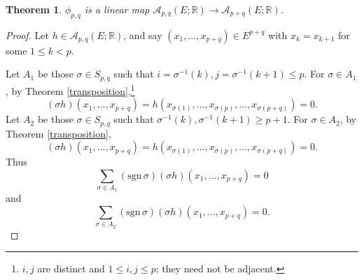 \documentclass{article}
\newcommand{\sgn}{\mathrm{sgn}\,}
\newtheorem{theorem}{Theorem}
\theoremstyle{definition}
\begin{document}
\begin{theorem}
$\phi_{p,q}$ is a linear map $\mathscr{A}_{p,q}(E;\mathbb{R}) \to \mathscr{A}_{p+q}(E;\mathbb{R})$.
\end{theorem}
\begin{proof}
Let $h \in \mathscr{A}_{p,q}(E;\mathbb{R})$,
and say $(x_1,\ldots,x_{p+q}) \in E^{p+q}$ with $x_k=x_{k+1}$ for some $1 \leq k < p$.

Let $A_1$ be those $\sigma \in S_{p,q}$ such that  $i=\sigma^{-1}(k), j=\sigma^{-1}(k+1) \leq p$. For $\sigma \in A_1$,
by Theorem \ref{transposition},\footnote{$i,j$ are distinct and $1 \leq i,j \leq p$; they need not be adjacent.}
\[
(\sigma h)(x_1,\ldots,x_{p+q})=h(x_{\sigma(1)},\ldots,x_{\sigma(p)},\ldots,x_{\sigma(p+q)})=0.
\]
Let $A_2$ be those $\sigma \in S_{p,q}$ such that $\sigma^{-1}(k), \sigma^{-1}(k+1) \geq p+1$. For $\sigma \in A_2$,
by Theorem \ref{transposition},
\[
(\sigma h)(x_1,\ldots,x_{p+q}) = h(x_{\sigma(1)},\ldots,x_{\sigma(p)},\ldots,x_{\sigma(p+q)})=0.
\]
Thus
\[
\sum_{\sigma \in A_1} (\sgn \sigma) (\sigma h)(x_1,\ldots,x_{p+q})=0
\]
and
\[
\sum_{\sigma \in A_2} (\sgn \sigma) (\sigma h)(x_1,\ldots,x_{p+q})=0.
\]


\end{proof}
\end{document}
